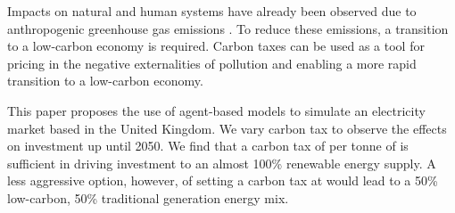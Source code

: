 Impacts on natural and human systems have already been observed due to anthropogenic greenhouse gas emissions \cite{Masson-Delmotte2018}. To reduce these emissions, a transition to a low-carbon economy is required. Carbon taxes can be used as a tool for pricing in the negative externalities of pollution and enabling a more rapid transition to a low-carbon economy.

This paper proposes the use of agent-based models to simulate an electricity market based in the United Kingdom. We vary carbon tax to observe the effects on investment up until 2050. We find that a carbon tax of  per tonne of  is sufficient in driving investment to an almost 100\% renewable energy supply. A less aggressive option, however, of setting a carbon tax at  would lead to a 50\% low-carbon, 50\% traditional generation energy mix.

